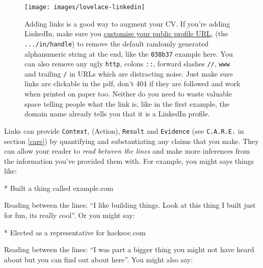 \documentclass[
]{book}
\newenvironment{Shaded}{\begin{snugshade}}{\end{snugshade}}
\newcommand{\NormalTok}[1]{#1}
\newcommand{\SpecialStringTok}[1]{\textcolor[rgb]{0.31,0.60,0.02}{#1}}
\begin{document}
\begin{figure}

{\centering \texttt{[image: images/lovelace-linkedin]} 

}

\caption{Adding links is a good way to augment your CV. If you're adding LinkedIn, make sure you \href{https://www.linkedin.com/help/linkedin/topics/6042/6054/87}{customise your public profile URL}, (the \texttt{.../in/handle}) to remove the default randomly generated alphanumeric string at the end, like the \texttt{038b37} example here. \citep{customlinkedin} You can also remove any ugly \texttt{http}, colons \texttt{::}, forward slashes \texttt{//}, \texttt{www} and trailing \texttt{/} in URLs which are distracting noise. Just make sure links are clickable in the pdf, don't 404 if they are followed and work when printed on paper too. Neither do you need to waste valuable space telling people what the link is, like in the first example, the domain name already tells you that it is a LinkedIn profile.}\label{fig:lovelace-fig}
\end{figure}



Links can provide \texttt{Context}, (Action), \texttt{Result} and \texttt{Evidence} (see \texttt{C.A.R.E.} in section \ref{care}) by quantifying and substantiating any claims that you make. They can allow your reader to \emph{read between the lines} and make more inferences from the information you've provided them with. For example, you might says things like:

\begin{Shaded}
\begin{Highlighting}[]
\SpecialStringTok{* }\NormalTok{Built a thing called example.com}
\end{Highlighting}
\end{Shaded}

Reading between the lines: ``I like building things. Look at this thing I built just for fun, its really cool''. Or you might say:

\begin{Shaded}
\begin{Highlighting}[]
\SpecialStringTok{* }\NormalTok{Elected as a representative for hacksoc.com}
\end{Highlighting}
\end{Shaded}

Reading between the lines: ``I was part a bigger thing you might not have heard about but you can find out about here''. You might also say:
\end{document}
